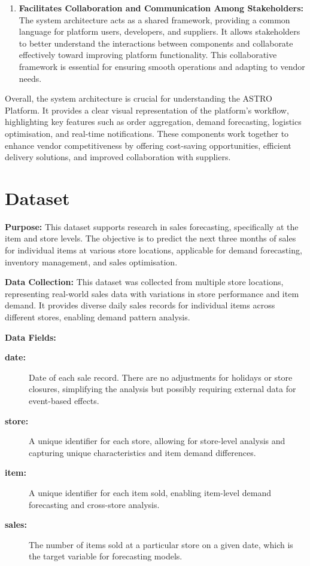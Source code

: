 \begin{enumerate}
    \item \textbf{Facilitates Collaboration and Communication Among Stakeholders:} The system architecture acts as a shared framework, providing a common language for platform users, developers, and suppliers. It allows stakeholders to better understand the interactions between components and collaborate effectively toward improving platform functionality. This collaborative framework is essential for ensuring smooth operations and adapting to vendor needs.

\end{enumerate}

\noindent Overall, the system architecture is crucial for understanding the ASTRO Platform. It provides a clear visual representation of the platform’s workflow, highlighting key features such as order aggregation, demand forecasting, logistics optimisation, and real-time notifications. These components work together to enhance vendor competitiveness by offering cost-saving opportunities, efficient delivery solutions, and improved collaboration with suppliers.

\section{Dataset}


\textbf{Purpose:} This dataset supports research in sales forecasting, specifically at the item and store levels. The objective is to predict the next three months of sales for individual items at various store locations, applicable for demand forecasting, inventory management, and sales optimisation.

\textbf{Data Collection:} This dataset was collected from multiple store locations, representing real-world sales data with variations in store performance and item demand. It provides diverse daily sales records for individual items across different stores, enabling demand pattern analysis.

\textbf{Data Fields:}
\begin{description}
    \item[\textbf{date:}] Date of each sale record. There are no adjustments for holidays or store closures, simplifying the analysis but possibly requiring external data for event-based effects.
    \item[\textbf{store:}] A unique identifier for each store, allowing for store-level analysis and capturing unique characteristics and item demand differences.
    \item[\textbf{item:}] A unique identifier for each item sold, enabling item-level demand forecasting and cross-store analysis.
    \item[\textbf{sales:}] The number of items sold at a particular store on a given date, which is the target variable for forecasting models.
\end{description}

